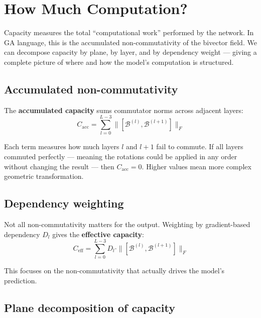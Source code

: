 \documentclass[11pt, twoside, openright]{memoir}
\newcommand{\bivec}[1]{\mathcal{B}^{(#1)}}  %
\numberwithin{equation}{chapter}
\begin{document}
\chapter{How Much Computation?}
\label{chap:capacity}

\begin{whycare}
Capacity measures the total ``computational work'' performed by the
network.  In GA language, this is the accumulated non-commutativity
of the bivector field.  We can decompose capacity by plane, by layer,
and by dependency weight --- giving a complete picture of where and how
the model's computation is structured.
\end{whycare}

\section{Accumulated non-commutativity}

The \textbf{accumulated capacity} sums commutator norms across adjacent
layers:
\begin{equation}
  C_{\mathrm{acc}} = \sum_{l=0}^{L-3} \|[\bivec{l}, \bivec{l+1}]\|_F
\end{equation}

Each term measures how much layers $l$ and $l+1$ fail to commute.  If
all layers commuted perfectly --- meaning the rotations could be applied in any order without changing the result --- then $C_{\mathrm{acc}} = 0$.
Higher values mean more complex geometric transformation.

\section{Dependency weighting}

Not all non-commutativity matters for the output.  Weighting by
gradient-based dependency $D_l$ gives the \textbf{effective capacity}:
\begin{equation}
  C_{\mathrm{eff}} = \sum_{l=0}^{L-3} D_l \cdot \|[\bivec{l}, \bivec{l+1}]\|_F
\end{equation}

This focuses on the non-commutativity that actually drives the model's
prediction.

\section{Plane decomposition of capacity}
\end{document}
